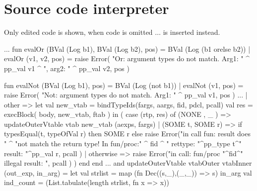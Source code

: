 \documentclass[10pt]{article}
\begin{document}
\section{Source code interpreter}
Only edited code is shown, when code is omitted $\ldots$ is inserted instead.
\begin{fancycode}[frame=lines,fontsize=\scriptsize,label=\textit{edited code - SRC/TpInterpret.sml - }]
...
fun evalOr (BVal (Log b1), BVal (Log b2), pos) = BVal (Log (b1 orelse b2))
  | evalOr (v1, v2, pos) =
        raise Error( "Or: argument types do not match. Arg1: " ^
                      pp_val v1 ^ ", arg2: " ^ pp_val v2, pos )

fun evalNot (BVal (Log b1), pos) = BVal (Log (not b1))
  | evalNot (v1, pos) =
        raise Error( "Not: argument types do not match. Arg1: " ^
                      pp_val v1, pos )
...
        | other    =>
            let val new_vtab = bindTypeIds(fargs, aargs, fid, pdcl, pcall)
                val res  = execBlock( body, new_vtab, ftab )
            in  ( case (rtp, res) of
                    (NONE  , _     ) => updateOuterVtable vtab new_vtab (aexps, fargs)
                  | (SOME t, SOME r) => if   typesEqual(t, typeOfVal r) 
                                        then SOME r
                                        else raise Error("in call fun: result does " ^
                                                         "not match the return type! In fun/proc:" ^ fid ^ 
                                                         " rettype: "^pp_type t^" result: "^pp_val r, pcall )
                  | otherwise        => raise Error("in call: fun/proc "^fid^" illegal result: ", pcall ) )
            end
      end
...
and updateOuterVtable vtabOuter vtabInner (out_exp, in_arg) =
let
   val strlist = map (fn Dec((s,_),(_,_)) => s) in_arg
   val ind_count  =  (List.tabulate(length strlist, fn x => x))


\end{fancycode}
\end{document}
